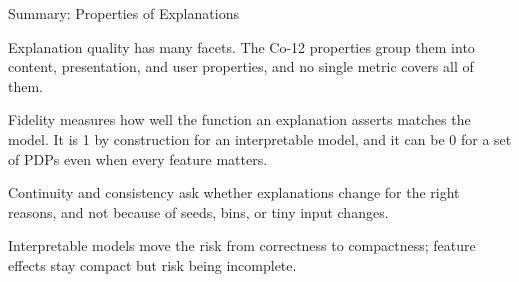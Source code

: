 \documentclass[10pt,compress,t,notes=noshow, xcolor=table]{beamer}
\begin{document}
\begin{framev}[align=mid]{Summary: Properties of Explanations}
\begin{itemizeM}
\item Explanation quality has many facets. The Co-12 properties group them into content, presentation, and user properties, and no single metric covers all of them.
\item Fidelity measures how well the function an explanation asserts matches the model. It is 1 by construction for an interpretable model, and it can be 0 for a set of PDPs even when every feature matters.
\item Continuity and consistency ask whether explanations change for the right reasons, and not because of seeds, bins, or tiny input changes.
\item Interpretable models move the risk from correctness to compactness; feature effects stay compact but risk being incomplete.
\end{itemizeM}
\end{framev}



\endlecture
\end{document}
